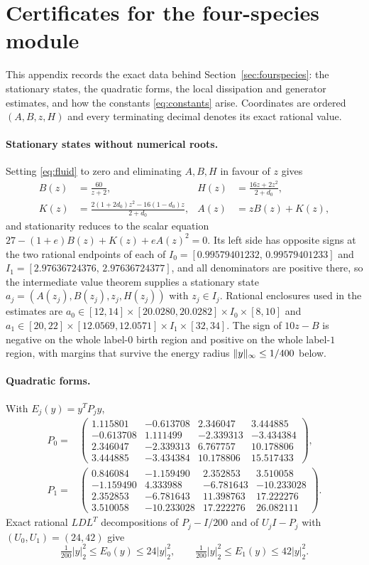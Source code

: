 \section{Certificates for the four-species module}\label{app:source}

This appendix records the exact data behind Section~\ref{sec:fourspecies}: the stationary states, the quadratic forms, the local dissipation and generator estimates, and how the constants \eqref{eq:constants} arise. Coordinates are ordered $(A,B,z,H)$ and every terminating decimal denotes its exact rational value.

\paragraph{Stationary states without numerical roots.}
Setting \eqref{eq:fluid} to zero and eliminating $A,B,H$ in favour of $z$ gives
\begin{align*}
 B(z)&=\frac{60}{z+2},& H(z)&=\frac{16z+2z^2}{2+d_0},\\
 K(z)&=\frac{2(1+2d_0)z^2-16(1-d_0)z}{2+d_0},& A(z)&=zB(z)+K(z),
\end{align*}
and stationarity reduces to the scalar equation $27-(1+e)B(z)+K(z)+eA(z)^2=0$. Its left side has opposite signs at the two rational endpoints of each of $I_0=[0.99579401232,\,0.99579401233]$ and $I_1=[2.97636724376,\,2.97636724377]$, and all denominators are positive there, so the intermediate value theorem supplies a stationary state $a_j=(A(z_j),B(z_j),z_j,H(z_j))$ with $z_j\in I_j$. Rational enclosures used in the estimates are $a_0\in[12,14]\times[20.0280,20.0282]\times I_0\times[8,10]$ and $a_1\in[20,22]\times[12.0569,12.0571]\times I_1\times[32,34]$. The sign of $10z-B$ is negative on the whole label-$0$ birth region and positive on the whole label-$1$ region, with margins that survive the energy radius $\lVert y\rVert_\infty\le1/400$ below.

\paragraph{Quadratic forms.}
With $E_j(y)=y^TP_jy$,
\begin{align*}
P_0={}&\begin{pmatrix}
1.115801&-0.613708&2.346047&3.444885\\
-0.613708&1.111499&-2.339313&-3.434384\\
2.346047&-2.339313&6.767757&10.178806\\
3.444885&-3.434384&10.178806&15.517433
\end{pmatrix},\\[3pt]
P_1={}&\begin{pmatrix}
0.846084&-1.159490&2.352853&3.510058\\
-1.159490&4.333988&-6.781643&-10.233028\\
2.352853&-6.781643&11.398763&17.222276\\
3.510058&-10.233028&17.222276&26.082111
\end{pmatrix}.
\end{align*}
Exact rational $LDL^T$ decompositions of $P_j-I/200$ and of $U_jI-P_j$ with $(U_0,U_1)=(24,42)$ give
\[
 \tfrac1{200}|y|_2^2\le E_0(y)\le24|y|_2^2,\qquad \tfrac1{200}|y|_2^2\le E_1(y)\le42|y|_2^2 .
\]

